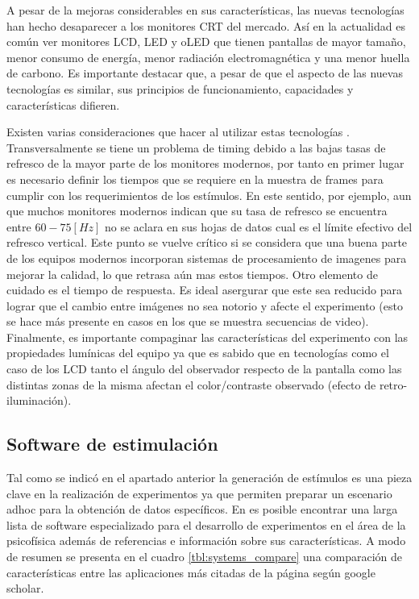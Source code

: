 \documentclass[../main.tex]{subfiles}
\begin{document}
			A pesar de la mejoras considerables en sus características, las nuevas tecnologías han hecho desaparecer a los monitores CRT del mercado. Así en la actualidad es común ver monitores LCD, LED y oLED que tienen pantallas de mayor tamaño, menor consumo de energía, menor radiación electromagnética y una menor huella de carbono. Es importante destacar que, a pesar de que el aspecto de las nuevas tecnologías es similar, sus principios de funcionamiento, capacidades y características difieren.

			Existen varias consideraciones que hacer al utilizar estas tecnologías \cite{article:monitor_wang, article:monitor_elze}. Transversalmente se tiene un problema de timing debido a las bajas tasas de refresco de la mayor parte de los monitores modernos, por tanto en primer lugar es necesario definir los tiempos que se requiere en la muestra de frames para cumplir con los requerimientos de los estímulos. En este sentido, por ejemplo, aun que muchos monitores modernos indican que su tasa de refresco se encuentra entre $60-75[Hz]$ no se aclara en sus hojas de datos cual es el límite efectivo del refresco vertical. Este punto se vuelve crítico si se considera que una buena parte de los equipos modernos incorporan sistemas de procesamiento de imagenes para mejorar la calidad, lo que retrasa aún mas estos tiempos. Otro elemento de cuidado es el tiempo de respuesta. Es ideal asergurar que este sea reducido para lograr que el cambio entre imágenes no sea notorio y afecte el experimento (esto se hace más presente en casos en los que se muestra secuencias de video). Finalmente, es importante compaginar las características del experimento con las propiedades lumínicas del equipo ya que es sabido que en tecnologías como el caso de los LCD tanto el ángulo del observador respecto de la pantalla como las distintas zonas de la misma afectan el color/contraste observado (efecto de retro-iluminación). 
			
		\subsection{Software de estimulación}
		\label{sub:02_software_de_estimulacion}

			Tal como se indicó en el apartado anterior la generación de estímulos es una pieza clave en la realización de experimentos ya que permiten preparar un escenario adhoc para la obtención de datos específicos. En \cite{website:software} es posible encontrar una larga lista de software especializado para el desarrollo de experimentos en el área de la psicofísica además de referencias e información sobre sus características. A modo de resumen se presenta en el cuadro \ref{tbl:systems_compare} una comparación de características entre las aplicaciones más citadas de la página según google scholar.  
\end{document}
